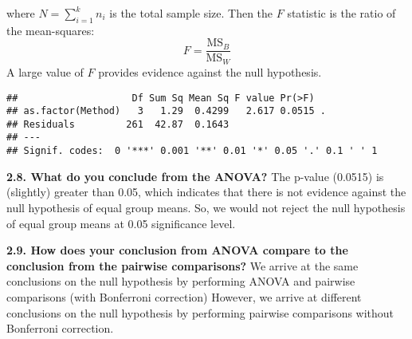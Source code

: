 \documentclass[
]{article}
\newenvironment{Shaded}{\begin{snugshade}}{\end{snugshade}}
\newcommand{\AttributeTok}[1]{\textcolor[rgb]{0.77,0.63,0.00}{#1}}
\newcommand{\FunctionTok}[1]{\textcolor[rgb]{0.00,0.00,0.00}{#1}}
\newcommand{\NormalTok}[1]{#1}
\newcommand{\SpecialCharTok}[1]{\textcolor[rgb]{0.00,0.00,0.00}{#1}}
\begin{document}
where \(N=\sum_{i=1}^k n_i\) is the total sample size. Then the \(F\)
statistic is the ratio of the mean-squares: \[
F=\frac{\mbox{MS}_B}{\mbox{MS}_W}
\] A large value of \(F\) provides evidence against the null hypothesis.

\begin{Shaded}
\end{Shaded}

\begin{verbatim}
##                    Df Sum Sq Mean Sq F value Pr(>F)  
## as.factor(Method)   3   1.29  0.4299   2.617 0.0515 .
## Residuals         261  42.87  0.1643                 
## ---
## Signif. codes:  0 '***' 0.001 '**' 0.01 '*' 0.05 '.' 0.1 ' ' 1
\end{verbatim}

\textbf{2.8. What do you conclude from the ANOVA?} The p-value (0.0515)
is (slightly) greater than 0.05, which indicates that there is not
evidence against the null hypothesis of equal group means. So, we would
not reject the null hypothesis of equal group means at 0.05 significance
level.

\textbf{2.9. How does your conclusion from ANOVA compare to the
conclusion from the pairwise comparisons?} We arrive at the same
conclusions on the null hypothesis by performing ANOVA and pairwise
comparisons (with Bonferroni correction) However, we arrive at different
conclusions on the null hypothesis by performing pairwise comparisons
without Bonferroni correction.
\end{document}

